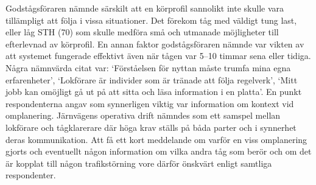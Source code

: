 Godstågsföraren nämnde särskilt att en körprofil sannolikt inte skulle vara tillämpligt att följa i vissa situationer.
Det förekom tåg med väldigt tung last, eller låg STH (70) som skulle medföra små och utmanade möjligheter till efterlevnad av körprofil.
En annan faktor godstågsföraren nämnde var vikten av att systemet fungerade effektivt även när tågen var 5--10 timmar sena eller tidiga.
Några nämnvärda citat var: \lq{}Förståelsen för nyttan måste trumfa mina egna erfarenheter\rq{}, \lq{}Lokförare är individer som är tränade att följa regelverk\rq{}, \lq{}Mitt jobb kan omöjligt gå ut på att sitta och läsa information i en platta\rq{}.
En punkt respondenterna angav som synnerligen viktig var information om kontext vid omplanering.
Järnvägens operativa drift nämndes som ett samspel mellan lokförare och tågklarerare där höga krav ställs på båda parter och i synnerhet deras kommunikation.
Att få ett kort meddelande om varför en viss omplanering gjorts och eventuellt någon information om vilka andra tåg som berör och om det är kopplat till någon trafikstörning vore därför önskvärt enligt samtliga respondenter.
